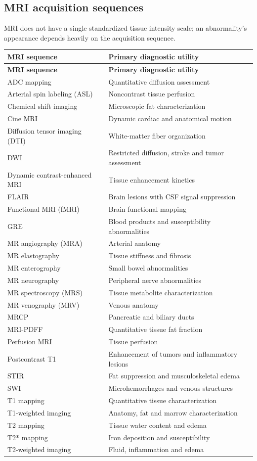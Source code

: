 \subsection{MRI acquisition sequences}
MRI does not have a single standardized tissue intensity scale; an abnormality's appearance depends heavily on the acquisition sequence.
\begin{longtable}{@{}p{}p{}@{}}
\toprule
\textbf{MRI sequence} & \textbf{Primary diagnostic utility} \\
\midrule
\endfirsthead
\toprule
\textbf{MRI sequence} & \textbf{Primary diagnostic utility} \\
\midrule
\endhead
ADC mapping & Quantitative diffusion assessment \\
Arterial spin labeling (ASL) & Noncontrast tissue perfusion \\
Chemical shift imaging & Microscopic fat characterization \\
Cine MRI & Dynamic cardiac and anatomical motion \\
Diffusion tensor imaging (DTI) & White-matter fiber organization \\
DWI & Restricted diffusion, stroke and tumor assessment \\
Dynamic contrast-enhanced MRI & Tissue enhancement kinetics \\
FLAIR & Brain lesions with CSF signal suppression \\
Functional MRI (fMRI) & Brain functional mapping \\
GRE & Blood products and susceptibility abnormalities \\
MR angiography (MRA) & Arterial anatomy \\
MR elastography & Tissue stiffness and fibrosis \\
MR enterography & Small bowel abnormalities \\
MR neurography & Peripheral nerve abnormalities \\
MR spectroscopy (MRS) & Tissue metabolite characterization \\
MR venography (MRV) & Venous anatomy \\
MRCP & Pancreatic and biliary ducts \\
MRI-PDFF & Quantitative tissue fat fraction \\
Perfusion MRI & Tissue perfusion \\
Postcontrast T1 & Enhancement of tumors and inflammatory lesions \\
STIR & Fat suppression and musculoskeletal edema \\
SWI & Microhemorrhages and venous structures \\
T1 mapping & Quantitative tissue characterization \\
T1-weighted imaging & Anatomy, fat and marrow characterization \\
T2 mapping & Tissue water content and edema \\
T2* mapping & Iron deposition and susceptibility \\
T2-weighted imaging & Fluid, inflammation and edema \\
\bottomrule
\end{longtable}

